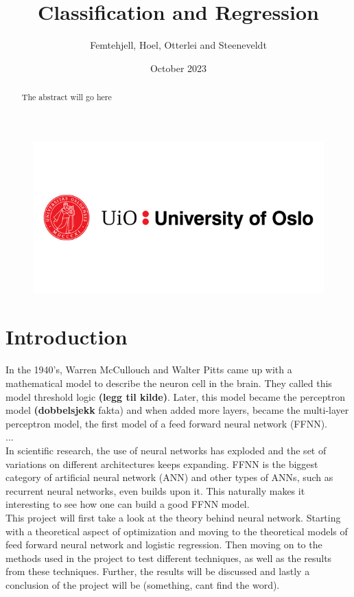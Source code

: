 \documentclass{article}
\title{Classification and Regression}
\author{Femtehjell, Hoel, Otterlei and Steeneveldt}
\date{October 2023}
\begin{document}

\maketitle
\begin{figure}[H]
    \centering
    \includegraphics[scale=0.5]{1797261_uio-logo.png}
\end{figure}
\newpage
\tableofcontents
\listoffigures


\newpage

\begin{abstract}
    The abstract will go here
\end{abstract}

\section{Introduction}
In the 1940's, Warren McCullouch and Walter Pitts came up with a mathematical model to describe the neuron cell in the brain. They called this model threshold logic \textbf{(legg til kilde)}. Later, this model became the perceptron model \textbf{(dobbelsjekk} fakta) and when added more layers, became the multi-layer perceptron model, the first model of a feed forward neural network (FFNN). \\
... \\
In scientific research, the use of neural networks has exploded and the set of variations on different architectures keeps expanding. FFNN is the biggest category of artificial neural network (ANN) and other types of ANNs, such as recurrent neural networks, even builds upon it. This naturally makes it interesting to see how one can build a good FFNN model. \\
This project will first take a look at the theory behind neural network. Starting with a theoretical aspect of optimization and moving to the theoretical models of feed forward neural network and logistic regression. Then moving on to the methods used in the project to test different techniques, as well as the results from these techniques. Further, the results will be discussed and lastly a conclusion of the project will be (something, cant find the word).
\end{document}
